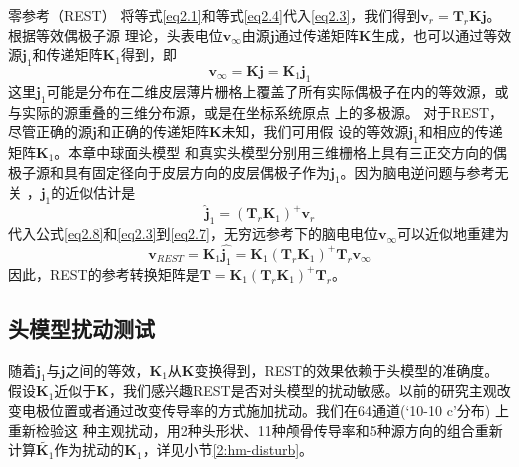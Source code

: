 零参考（REST）
将等式\eqref{eq2.1}和等式\eqref{eq2.4}代入\eqref{eq2.3}，我们得到$\mathbf{v}_r=\mathbf{T}_{r}\mathbf{Kj}$。根据等效偶极子源
理论，头表电位$\mathbf{v}_{\infty}$由源$\mathbf{j}$通过传递矩阵$\mathbf{K}$生成，也可以通过等效源$\mathbf{j}_1$和传递矩阵$\mathbf{K}_1$得到，即
\begin{equation}\label{eq2.7}
\mathbf{v}_{\infty}=\mathbf{Kj}=\mathbf{K}_1\mathbf{j}_1
\end{equation}
这里$\mathbf{j}_1$可能是分布在二维皮层薄片栅格上覆盖了所有实际偶极子在内的等效源，或与实际的源重叠的三维分布源，或是在坐标系统原点
上的多极源。 对于REST，尽管正确的源$\mathbf{j}$和正确的传递矩阵$\mathbf{K}$未知，我们可用假
设的等效源$\mathbf{j}_1$和相应的传递矩阵$\mathbf{K}_1$。本章中球面头模型
和真实头模型分别用三维栅格上具有三正交方向的偶极子源和具有固定径向于皮层方向的皮层偶极子作为$\mathbf{j}_1$。因为脑电逆问题与参考无关
，$\mathbf{j}_1$的近似估计是
\begin{equation}\label{eq2.8}
\hat{\mathbf{j}}_1=(\mathbf{T}_r\mathbf{K}_1)^+\mathbf{v}_r
\end{equation}
代入公式\eqref{eq2.8}和\eqref{eq2.3}到\eqref{eq2.7}，无穷远参考下的脑电电位$\mathbf{v}_{\infty}$可以近似地重建为
\begin{equation}\label{eq2.9}
\mathbf{v}_{REST}=\mathbf{K}_1\hat{\mathbf{j}_1}=\mathbf{K}_1(\mathbf{T}_r\mathbf{K}_1)^+\mathbf{T}_r\mathbf{v}_\infty
\end{equation}
因此，REST的参考转换矩阵是$\mathbf{T}=\mathbf{K}_1(\mathbf{T}_r\mathbf{K}_1)^+\mathbf{T}_r$。
\subsection{头模型扰动测试}
随着$\mathbf{j}_1$与$\mathbf{j}$之间的等效，$\mathbf{K}_1$从$\mathbf{K}$变换得到，REST的效果依赖于头模型的准确度。假设$\mathbf{K}_1$近似于$\mathbf{K}$，我们感兴趣REST是否对头模型的扰动敏感。以前的研究主观改变电极位置或者通过改变传导率的方式施加扰动。我们在64通道(‘10-10 c’分布) 上重新检验这
种主观扰动，用2种头形状、11种颅骨传导率和5种源方向的组合重新计算$\tilde{\mathbf{K}_1}$作为扰动的$\mathbf{K}_1$，详见小节\ref{2:hm-disturb}。

